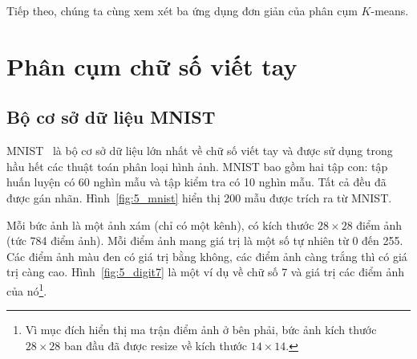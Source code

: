Tiếp theo, chúng ta cùng xem xét ba ứng dụng đơn giản của phân cụm $K$-means. 






\section{Phân cụm chữ số viết tay }

\subsection{Bộ cơ sở dữ liệu MNIST }

MNIST~\cite{lecun2010mnist} là bộ cơ sở dữ liệu lớn nhất về chữ số viết tay và
được sử dụng trong hầu hết các thuật toán phân loại hình ảnh. MNIST bao gồm hai
tập con: tập huấn luyện có 60 nghìn mẫu và tập kiểm tra có 10 nghìn mẫu. Tất cả
đều đã được gán nhãn. Hình~\ref{fig:5_mnist} hiển thị 200 mẫu được trích ra từ
MNIST.




Mỗi bức ảnh là một ảnh xám (chỉ có một kênh), có kích thước $28\times28$
điểm ảnh (tức 784 điểm ảnh). Mỗi điểm ảnh mang giá trị là một số tự nhiên từ 0
đến 255. Các điểm ảnh màu đen có giá trị bằng không, các điểm ảnh càng trắng thì có giá trị càng cao. Hình~\ref{fig:5_digit7} là một ví dụ về chữ
số 7 và giá trị các điểm ảnh của nó\footnote{Vì mục đích hiển thị ma trận điểm ảnh ở
bên phải, bức ảnh kích thước $28 \times 28$ ban đầu đã được resize về kích thước
$14 \times 14$.}.

